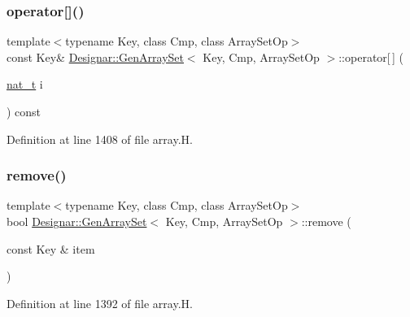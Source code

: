 \subsubsection{\texorpdfstring{operator[]()}{operator[]()}\hspace{0.1cm}{\footnotesize\ttfamily [2/2]}}
{\footnotesize\ttfamily template$<$typename Key, class Cmp, class Array\+Set\+Op$>$ \\
const Key\& \hyperlink{class_designar_1_1_gen_array_set}{Designar\+::\+Gen\+Array\+Set}$<$ Key, Cmp, Array\+Set\+Op $>$\+::operator\mbox{[}$\,$\mbox{]} (\begin{DoxyParamCaption}\item[{\hyperlink{namespace_designar_aa72662848b9f4815e7bf31a7cf3e33d1}{nat\+\_\+t}}]{i }\end{DoxyParamCaption}) const\hspace{0.3cm}{\ttfamily [inline]}}



Definition at line 1408 of file array.\+H.

\mbox{\label{class_designar_1_1_gen_array_set_acddff41221307179e0b4c20afbcfe253}} 
\subsubsection{\texorpdfstring{remove()}{remove()}}
{\footnotesize\ttfamily template$<$typename Key, class Cmp, class Array\+Set\+Op$>$ \\
bool \hyperlink{class_designar_1_1_gen_array_set}{Designar\+::\+Gen\+Array\+Set}$<$ Key, Cmp, Array\+Set\+Op $>$\+::remove (\begin{DoxyParamCaption}\item[{const Key \&}]{item }\end{DoxyParamCaption})\hspace{0.3cm}{\ttfamily [inline]}}



Definition at line 1392 of file array.\+H.

\mbox{\label{class_designar_1_1_gen_array_set_ab6e8baee6087d491045de115ed7fb48e}} 
